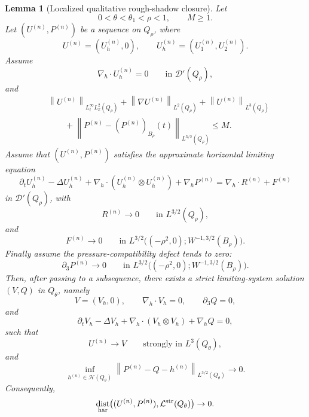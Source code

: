 \documentclass[11pt]{article}
\numberwithin{equation}{section}
\theoremstyle{plain}
\newtheorem{lemma}{Lemma}[section]
\theoremstyle{definition}
\theoremstyle{remark}
\DeclareMathOperator{\dist}{dist}
\newcommand{\nabh}{\nabla_h}
\newcommand{\divh}{\nabla_h\!\cdot}
\newcommand{\norm}[2]{\left\|#1\right\|_{#2}}
\newcommand{\calH}{\mathcal H}
\newcommand{\calL}{\mathcal L}
\begin{document}
\begin{lemma}[Localized qualitative rough-shadow closure]
\label{pI:lem:localized-qual-rough-shadow}
Let
\[
        0<\theta<\theta_1<\rho<1,
        \qquad
        M\ge1 .
\]
Let \((U^{(n)},P^{(n)})\) be a sequence on \(Q_\rho\), where
\[
        U^{(n)}=(U_h^{(n)},0),
        \qquad
        U_h^{(n)}=(U_1^{(n)},U_2^{(n)}).
\]
Assume
\[
        \divh U_h^{(n)}=0
        \qquad\text{in }\mathcal D'(Q_\rho),
\]
and
\begin{equation}\label{pI:eq:rough-shadow-uniform-bounds}
\begin{aligned}
&\norm{U^{(n)}}{L^\infty_tL^2_x(Q_\rho)}
+
\norm{\nabla U^{(n)}}{L^2(Q_\rho)}
+
\norm{U^{(n)}}{L^3(Q_\rho)}
\nonumber\\
&\qquad
+
\norm{P^{(n)}-(P^{(n)})_{B_\rho}(t)}{L^{3/2}(Q_\rho)}
\le M .
\end{aligned}
\end{equation}
Assume that \((U^{(n)},P^{(n)})\) satisfies the approximate horizontal limiting equation
\begin{equation}\label{pI:eq:approx-horizontal-limiting}
\partial_t U_h^{(n)}
-\Delta U_h^{(n)}
+\divh(U_h^{(n)}\otimes U_h^{(n)})
+\nabh P^{(n)}
=
\divh R^{(n)}+F^{(n)}
\end{equation}
in \(\mathcal D'(Q_\rho)\), with
\[
        R^{(n)}\to0
        \qquad\text{in }L^{3/2}(Q_\rho),
\]
and
\[
        F^{(n)}\to0
        \qquad\text{in }
        L^{3/2}\bigl((-\rho^2,0);W^{-1,3/2}(B_\rho)\bigr).
\]
Finally assume the pressure-compatibility defect tends to zero:
\[
        \partial_3P^{(n)}\to0
        \qquad\text{in }
        L^{3/2}\bigl((-\rho^2,0);W^{-1,3/2}(B_\rho)\bigr).
\]
Then, after passing to a subsequence, there exists a strict limiting-system solution \((V,Q)\) in \(Q_\theta\), namely
\[
        V=(V_h,0),
        \qquad
        \divh V_h=0,
        \qquad
        \partial_3Q=0,
\]
and
\[
        \partial_tV_h-\Delta V_h
        +\divh(V_h\otimes V_h)+\nabh Q=0,
\]
such that
\[
        U^{(n)}\to V
        \qquad\text{strongly in }L^3(Q_\theta),
\]
and
\[
        \inf_{h^{(n)}\in\calH(Q_\theta)}
        \norm{P^{(n)}-Q-h^{(n)}}{L^{3/2}(Q_\theta)}
        \to0 .
\]
Consequently,
\[
        \dist_{\rm har}
        \bigl((U^{(n)},P^{(n)}),\calL^{\rm str}(Q_\theta)\bigr)
        \to0 .
\]
\end{lemma}
\end{document}
